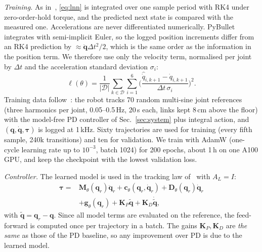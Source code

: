 \documentclass[conference]{IEEEtran}
\newcommand{\bq}{\boldsymbol{q}}
\newcommand{\dq}{\dot{\boldsymbol{q}}}
\newcommand{\ddq}{\ddot{\boldsymbol{q}}}
\newcommand{\btau}{\boldsymbol{\tau}}
\newcommand{\bM}{\boldsymbol{M}}
\newcommand{\bK}{\boldsymbol{K}}
\newcommand{\bD}{\boldsymbol{D}}
\newcommand{\bc}{\boldsymbol{c}}
\newcommand{\bg}{\boldsymbol{g}}
\begin{document}
\emph{Training.} As in~\cite{liu2024}, \eqref{eq:lnn} is integrated over one sample period with RK4 under zero-order-hold torque, and the predicted next state is compared with the measured one. Accelerations are never differentiated numerically. PyBullet integrates with semi-implicit Euler, so the logged position increments differ from an RK4 prediction by $\approx\ddq\Delta t^2/2$, which is the same order as the information in the position term. We therefore use only the velocity term, normalised per joint by $\Delta t$ and the acceleration standard deviation $\sigma_i$:
\begin{equation}
\ell(\theta)=\frac{1}{|\mathcal{D}|}\sum_{k\in\mathcal{D}}\sum_{i=1}^{6}\Big(\frac{\hat{\dot q}_{i,k+1}-\dot q_{i,k+1}}{\Delta t\,\sigma_i}\Big)^2.
\end{equation}
Training data follow~\cite{liu2024}: the robot tracks 70 random multi-sine joint references (three harmonics per joint, 0.05--0.5\,Hz, 20\,s each, links kept 8\,cm above the floor) with the model-free PD controller of Sec.~\ref{sec:system} plus integral action, and $(\bq,\dq,\btau)$ is logged at 1\,kHz. Sixty trajectories are used for training (every fifth sample, 240k transitions) and ten for validation. We train with AdamW (one-cycle learning rate up to $10^{-3}$, batch 1024) for 200 epochs, about 1\,h on one A100 GPU, and keep the checkpoint with the lowest validation loss.

\emph{Controller.} The learned model is used in the tracking law of~\cite[Eq.~25]{liu2024} with $A_L=I$:
\begin{equation}
\begin{split}
\btau = {}&\bM_\theta(\bq_r)\ddq_r + \bc_\theta(\bq_r,\dq_r) + \bD_\theta(\bq_r)\dq_r\\
&+ \bg_\theta(\bq_r) + \bK_P\tilde{\bq} + \bK_D\dot{\tilde{\bq}},
\end{split}
\label{eq:liu}
\end{equation}
with $\tilde{\bq}=\bq_r-\bq$. Since all model terms are evaluated on the reference, the feed-forward is computed once per trajectory in a batch. The gains $\bK_P,\bK_D$ are \emph{the same} as those of the PD baseline, so any improvement over PD is due to the learned model.
\end{document}
